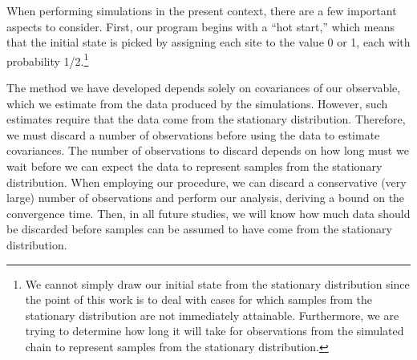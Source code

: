 When performing simulations in the present context, there are a few important
aspects to consider. First, our program begins with a ``hot start,'' which means
that the initial state is picked by assigning each site to the value 0 or 1, each
with probability 1/2.\footnote{We cannot simply draw our initial state
from the stationary distribution since the point of this work
is to deal with cases for which samples from the stationary distribution are not
immediately attainable. Furthermore, we are trying to determine how long it will
take for observations from the simulated chain to represent samples from the
stationary distribution.}
%
%
%
%


The method we have developed depends solely on covariances
of our observable, which we estimate from the data produced by the
simulations. However, such estimates require that the data come from the
stationary distribution. Therefore, we must discard a number of observations
before using the data to estimate covariances. The number of observations 
to discard depends on how long must we wait 
before we can expect the data to represent samples from the stationary distribution.
When employing our procedure, we can discard a
conservative (very large) number of observations and perform our analysis, deriving a bound on
the convergence time. Then, in all future studies, we will know how much data should be discarded
before samples can be assumed to have come from the stationary distribution.


